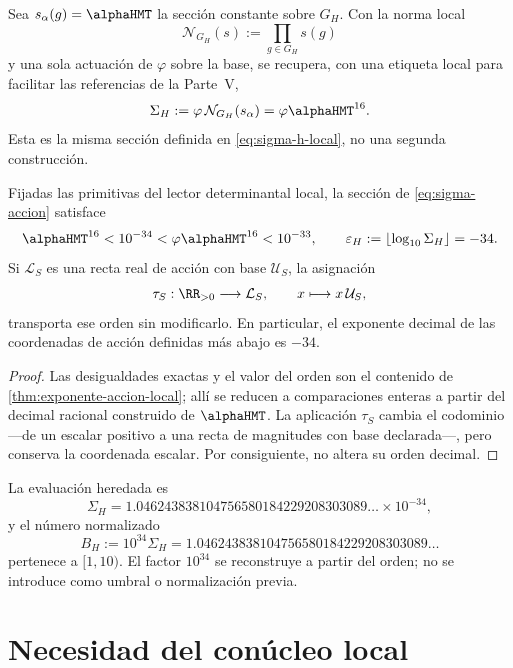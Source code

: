 Sea \(s_\alpha(g)=\alphaHMT\) la sección constante sobre \(G_H\). Con la
norma local
\[
\mathcal N_{G_H}(s):=\prod_{g\in G_H}s(g)
\]
y una sola actuación de \(\varphi\) sobre la base, se recupera, con una
etiqueta local para facilitar las referencias de la Parte~V,
\begin{equation}
\label{eq:sigma-accion}
\Sigma_H
:=\varphi\,\mathcal N_{G_H}(s_\alpha)
=\varphi\alphaHMT^{16}.
\end{equation}
Esta es la misma sección definida en \cref{eq:sigma-h-local}, no una segunda
construcción.

\begin{theorem}
\label{thm:orden-accion}
Fijadas las primitivas del lector determinantal local, la sección de
\cref{eq:sigma-accion} satisface
\[
\alphaHMT^{16}<10^{-34}
<\varphi\alphaHMT^{16}<10^{-33},
\qquad
\varepsilon_H:=\left\lfloor\log_{10}\Sigma_H\right\rfloor=-34.
\]
Si \(\mathcal L_S\) es una recta real de acción con base
\(\mathcal U_S\), la asignación
\[
\tau_S:\RR_{>0}\longrightarrow\mathcal L_S,
\qquad x\longmapsto x\,\mathcal U_S,
\]
transporta ese orden sin modificarlo. En particular, el exponente decimal
de las coordenadas de acción definidas más abajo es \(-34\).
\end{theorem}

\begin{proof}
Las desigualdades exactas y el valor del orden son el contenido de
\cref{thm:exponente-accion-local}; allí se reducen a comparaciones enteras a
partir del decimal racional construido de \(\alphaHMT\). La aplicación
\(\tau_S\) cambia el codominio —de un escalar positivo a una recta de
magnitudes con base declarada—, pero conserva la coordenada escalar. Por
consiguiente, no altera su orden decimal.
\end{proof}

La evaluación heredada es
\[
\Sigma_H
=1.046243838104756580184229208303089\ldots\times10^{-34},
\]
y el número normalizado
\[
B_H:=10^{34}\Sigma_H
=1.046243838104756580184229208303089\ldots
\]
pertenece a \([1,10)\). El factor \(10^{34}\) se reconstruye a partir del
orden; no se introduce como umbral o normalización previa.

\section{Necesidad del conúcleo local}

